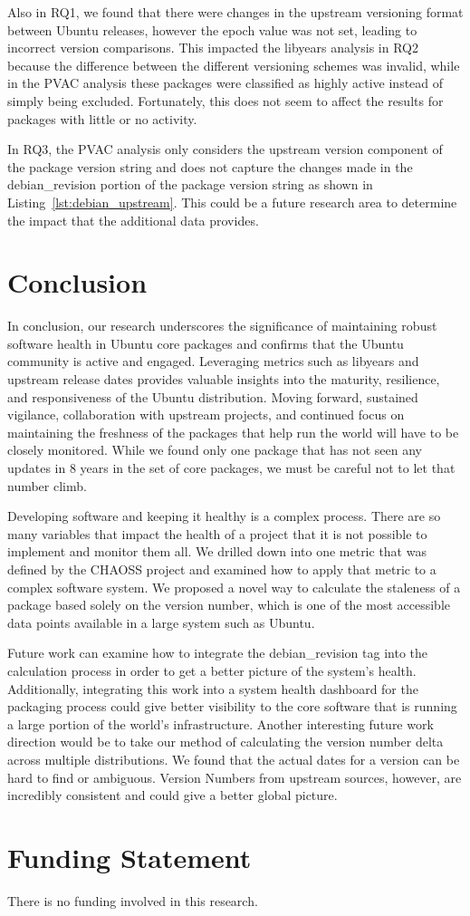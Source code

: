 \documentclass[sn-mathphys-num]{sn-jnl}%
\theoremstyle{thmstyleone}%
\theoremstyle{thmstyletwo}%
\theoremstyle{thmstylethree}%
\begin{document}
Also in RQ1, we found that there were changes in the upstream versioning format between Ubuntu releases, however the epoch value was not set, leading to incorrect version comparisons. This impacted the libyears analysis in RQ2 because the difference between the different versioning schemes was invalid, while in the PVAC analysis these packages were classified as highly active instead of simply being excluded. Fortunately, this does not seem to affect the results for packages with little or no activity.

In RQ3, the PVAC analysis only considers the upstream version component of the package version string and does not capture the changes made in the debian\_revision portion of the package version string as shown in Listing~\ref{lst:debian_upstream}. This could be a future research area to determine the impact that the additional data provides.

\section{Conclusion}

In conclusion, our research underscores the significance of maintaining robust software health in Ubuntu core packages and confirms that the Ubuntu community is active and engaged. Leveraging metrics such as libyears and upstream release dates provides valuable insights into the maturity, resilience, and responsiveness of the Ubuntu distribution. Moving forward, sustained vigilance, collaboration with upstream projects, and continued focus on maintaining the freshness of the packages that help run the world will have to be closely monitored. While we found only one package that has not seen any updates in 8 years in the set of core packages, we must be careful not to let that number climb.

Developing software and keeping it healthy is a complex process. There are so many variables that impact the health of a project that it is not possible to implement and monitor them all. We drilled down into one metric that was defined by the CHAOSS project and examined how to apply that metric to a complex software system. We proposed a novel way to calculate the staleness of a package based solely on the version number, which is one of the most accessible data points available in a large system such as Ubuntu.

Future work can examine how to integrate the debian\_revision tag into the calculation process in order to get a better picture of the system's health. Additionally, integrating this work into a system health dashboard for the packaging process could give better visibility to the core software that is running a large portion of the world's infrastructure. Another interesting future work direction would be to take our method of calculating the version number delta across multiple distributions. We found that the actual dates for a version can be hard to find or ambiguous. Version Numbers from upstream sources, however, are incredibly consistent and could give a better global picture.

\section{Funding Statement}
There is no funding involved in this research. 

%

\end{document}
